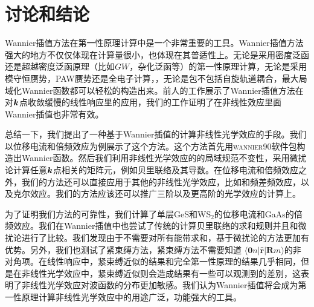 \section{讨论和结论\label{sec:discussions-and-conclusions}}


Wannier插值方法在第一性原理计算中是一个非常重要的工具。Wannier插值方法强大的地方不仅仅体现在计算量很小，也体现在其普适性上。无论是采用密度泛函还是超越密度泛函原理（比如$GW$，杂化泛函等）的第一性原理计算，无论是采用模守恒赝势，PAW赝势还是全电子计算，，无论是包不包括自旋轨道耦合，最大局域化Wannier函数都可以轻松的构造出来。前人的工作展示了Wannier插值方法在对$\boldsymbol{k}$点收敛缓慢的线性响应里的应用，我们的工作证明了在非线性效应里面Wannier插值也非常有效。


总结一下，我们提出了一种基于Wannier插值的计算非线性光学效应的手段。我们以位移电流和倍频效应为例展示了这个方法。这个方法首先用\textsc{wannier90}软件包构造出Wannier函数。然后我们利用非线性光学效应的的局域规范不变性，采用微扰论计算任意$\boldsymbol{k}$点相关的矩阵元，例如贝里联络及其导数。在位移电流和倍频效应之外，我们的方法还可以直接应用于其他的非线性光学效应，比如和频差频效应，以及克尔效应。我们的方法应该还可以推广三阶以及更高阶的光学效应的计算上。

为了证明我们方法的可靠性，我们计算了单层GeS和WS$_{2}$的位移电流和GaAs的倍频效应。我们在Wannier插值中也尝试了传统的计算贝里联络的求和规则并且和微扰论进行了比较。我们发现由于不需要对所有能带求和，基于微扰论的方法更加有优势。另外，我们也测试了紧束缚方法，紧束缚方法不需要知道 $\langle\mathbf{0}n|\hat{\mathbf{r}}|\mathbf{R}m\rangle$的非对角项。在线性响应中，紧束缚近似的结果和完全第一性原理的结果几乎相同，但是在非线性光学效应中，紧束缚近似则会造成结果有一些可以观测到的差别，这表明了非线性光学效应对波函数的分布更加敏感。我们认为Wannier插值将会成为第一性原理计算非线性光学效应中的用途广泛，功能强大的工具。
